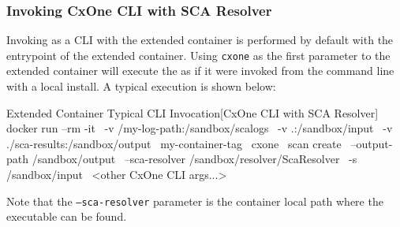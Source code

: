 \subsubsection{Invoking CxOne CLI with SCA Resolver}

Invoking \scaresolver as a CLI with the extended container is performed by default with the entrypoint
of the extended container.  Using \texttt{cxone} as the first parameter to the extended container will
execute the \cxonecli as if it were invoked from the command line with a local install. A typical
execution is shown below:\\


\begin{code}{Extended Container Typical CLI Invocation}{[CxOne CLI with SCA Resolver]}{}
    docker run --rm -it \
        -v /my-log-path:/sandbox/scalogs \
        -v .:/sandbox/input \
        -v ./sca-results:/sandbox/output \
        my-container-tag \
        cxone \
        scan create \
        --output-path /sandbox/output \
        --sca-resolver /sandbox/resolver/ScaResolver \
        -s /sandbox/input \
        <other CxOne CLI args...>
\end{code}

Note that the \texttt{--sca-resolver} parameter is the container local path where the \scaresolver
executable can be found.
